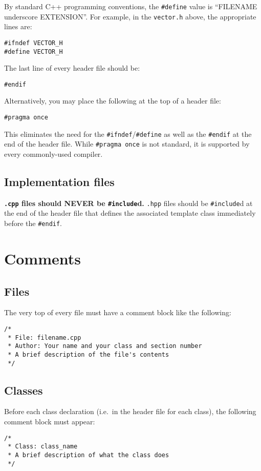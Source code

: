 \documentclass{article}
\newcommand{\code}[1]{\texttt{\colorbox{gray!30}{#1}}}
\begin{document}
By standard C++ programming conventions, the \code{\#define} value is ``FILENAME underscore EXTENSION''.
For example, in the \code{vector.h} above, the appropriate lines are:

\begin{lstlisting}
#ifndef VECTOR_H
#define VECTOR_H
\end{lstlisting}

The last line of every header file should be:

\begin{lstlisting}
#endif
\end{lstlisting}

Alternatively, you may place the following at the top of a header file:
\begin{lstlisting}
#pragma once
\end{lstlisting}

This eliminates the need for the \code{\#ifndef}/\code{\#define} as well as the \code{\#endif} at the end of the header file.
While \code{\#pragma once} is not standard, it is supported by every commonly-used compiler.

\subsection{Implementation files}
\textbf{\code{.cpp} files should NEVER be \code{\#include}d.}
\code{.hpp} files should be \code{\#include}d at the end of the header file that defines the associated template class immediately before the \code{\#endif}.

\section{Comments}

\subsection{Files}
The very top of every file must have a comment block like the following:
\begin{lstlisting}
/*
 * File: filename.cpp
 * Author: Your name and your class and section number
 * A brief description of the file's contents
 */
\end{lstlisting}

\subsection{Classes}
Before each class declaration (i.e.\ in the header file for each class), the following comment block must appear:
\begin{lstlisting}
/*
 * Class: class_name
 * A brief description of what the class does
 */
\end{lstlisting}
\end{document}
